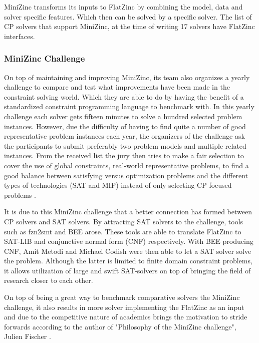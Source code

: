 MiniZinc transforms its inputs to FlatZinc by combining the model, data and solver specific features. Which then can be solved by a specific solver. The list of CP solvers that support MiniZinc, at the time of writing 17 solvers have FlatZinc interfaces.

\subsubsection{MiniZinc Challenge}
On top of maintaining and improving MiniZinc, its team also organizes a yearly challenge to compare and test what improvements have been made in the constraint solving world. Which they are able to do by having the benefit of a standardized constraint programming language to benchmark with. 
In this yearly challenge each solver gets fifteen minutes to solve a hundred selected problem instances. However, due the difficulty of having to find quite a number of good representative problem instances each year, the organizers of the challenge ask the participants to submit preferably two problem models and multiple related instances. From the received list the jury then tries to make a fair selection to cover the use of global constraints, real-world representative problems, to find a good balance between satisfying versus optimization problems and the different types of technologies (SAT and MIP) instead of only selecting CP focused problems \cite{58stuckey2014minizinc}.

It is due to this MiniZinc challenge that a better connection has formed between CP solvers and SAT solvers. By attracting SAT solvers to the challenge, tools such as fzn2smt \cite{72bofill2010system} and BEE \cite{69BEEmetodi2012compiling} arose. These tools are able to translate FlatZinc to SAT-LIB and conjunctive normal form (CNF) respectively. 
With BEE producing CNF, Amit Metodi and Michael Codish were then able to let a SAT solver solve the problem. Although the latter is limited to finite domain constraint problems, it allows utilization of large and swift SAT-solvers on top of bringing the field of research closer to each other.

On top of being a great way to benchmark comparative solvers the MiniZinc challenge, it also results in more solver implementing the FlatZinc as an input and due to the competitive nature of academics brings the motivation to stride forwards according to the author of "Philosophy of the MiniZinc challenge", Julien Fischer \cite{59stuckey2010philosophy}.

